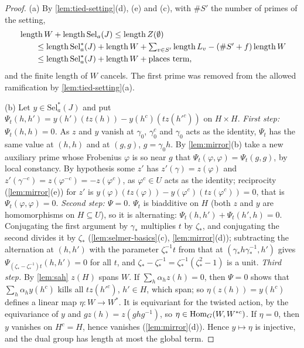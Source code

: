 \begin{proof}
(a) By \cref{lem:tied-setting}(d), (e) and (c), with $\#S'$ the number of primes of the setting,
\begin{align*}&\length W+\length\mathrm{Sel}_a(J)\le\length Z(\emptyset)\\
&\qquad\le\length\mathrm{Sel}^*_a(J)+\length W+\textstyle\sum_{v\in S'}\length L_v-(\#S'+f)\length W\\
&\qquad\le\length\mathrm{Sel}^*_a(J)+\length W+\text{places term},\end{align*}
and the finite length of $W$ cancels. The first prime was removed from the allowed ramification by \cref{lem:tied-setting}(a).

(b) Let $y\in\mathrm{Sel}^*_a(J)$ and put $\Psi_t(h,h')=y(h')(tz(h))-y(h^c)(tz(h'^c))$ on $H\times H$. \emph{First step: $\Psi_t(h,h)=0$.} As $z$ and $y$ vanish at $\gamma_0$, $\gamma_0^c$ and $\gamma_0$ acts as the identity, $\Psi_t$ has the same value at $(h,h)$ and at $(g,g)$, $g=\gamma_0h$. By \cref{lem:mirror}(b) take a new
auxiliary prime whose Frobenius $\varphi$ is so near $g$ that $\Psi_t(\varphi,\varphi)=\Psi_t(g,g)$, by local constancy. By hypothesis some $z'$ has $z'(\gamma)=z(\varphi)$ and $z'(\gamma^{-c})=z(\varphi^{-c})=-z(\varphi^c)$, as $\varphi^c\in U$ acts as the identity; reciprocity (\cref{lem:mirror}(e)) for $z'$ is
$y(\varphi)(tz(\varphi))-y(\varphi^c)(tz(\varphi^c))=0$, that is $\Psi_t(\varphi,\varphi)=0$. \emph{Second step: $\Psi=0$.} $\Psi_t$ is biadditive on $H$ (both $z$ and $y$ are homomorphisms on $H\subseteq U$), so it is alternating: $\Psi_t(h,h')+\Psi_t(h',h)=0$. Conjugating the first argument by $\gamma_*$ multiplies $t$ by $\zeta_*$, and conjugating the
second divides it by $\zeta_*$ (\cref{lem:selmer-basics}(c), \cref{lem:mirror}(d)); subtracting the alternation at $(h,h')$ with the parameter $\zeta_*^{-1}t$ from that at $(\gamma_*h\gamma_*^{-1},h')$ gives $\Psi_{(\zeta_*-\zeta_*^{-1})t}(h,h')=0$ for all $t$, and $\zeta_*-\zeta_*^{-1}=\zeta_*^{-1}(\zeta_*^2-1)$ is a unit. \emph{Third step.} By \cref{lem:sah}
$z(H)$ spans $W$. If $\sum_h\alpha_hz(h)=0$, then $\Psi=0$ shows that $\sum_h\alpha_hy(h^c)$ kills all $tz(h'^c)$, $h'\in H$, which span; so $\eta(z(h))=y(h^c)$ defines a linear map $\eta\colon W\to W^*$. It is equivariant for the twisted action, by the equivariance of $y$ and $gz(h)=z(ghg^{-1})$, so
$\eta\in\operatorname{Hom}_G(W,W^{*c})$. If $\eta=0$, then $y$ vanishes on $H^c=H$, hence vanishes (\cref{lem:mirror}(d)). Hence $y\mapsto\eta$ is injective, and the dual group has length at most the global term.
\end{proof}

